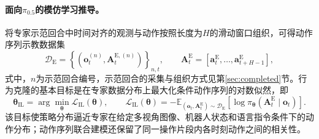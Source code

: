 \paragraph{面向\(\pi_{0.5}\)的模仿学习推导。}将专家示范回合中时间对齐的观测与动作按照长度为\(H\)的滑动窗口组织，可得动作序列示教数据集
\begin{equation}
  \mathcal D_{\mathrm E}
  =
  \left\{
    \left(\mathbf o_t^{(n)},\mathbf A_t^{\mathrm E,(n)}\right)
  \right\}_{n,t},
  \qquad
  \mathbf A_t^{\mathrm E}
  =
  \left[
    \mathbf a_t^{\mathrm E},\ldots,
    \mathbf a_{t+H-1}^{\mathrm E}
  \right],
  \label{eq:pi-demonstration-dataset}
\end{equation}
式中，\(n\)为示范回合编号，示范回合的采集与组织方式见第\ref{sec:completed}节。行为克隆的基本目标是在专家数据分布上最大化条件动作序列的对数似然，即
\begin{equation}
  \boldsymbol\theta_{\mathrm{IL}}
  =
  \arg\min_{\boldsymbol\theta}\mathcal L_{\mathrm{IL}}(\boldsymbol\theta),
  \qquad
  \mathcal L_{\mathrm{IL}}(\boldsymbol\theta)
  =
  -\mathbb E_{(\mathbf o_t,\mathbf A_t^{\mathrm E})\sim\mathcal D_{\mathrm E}}
  \left[
    \log \pi_{\boldsymbol\theta}
    \left(\mathbf A_t^{\mathrm E}\mid\mathbf o_t\right)
  \right].
  \label{eq:pi-il-nll}
\end{equation}
该目标使策略分布逼近专家在给定多视角图像、机器人状态和语言指令条件下的动作分布；动作序列联合建模还保留了同一操作片段内各时刻动作之间的相关性。

